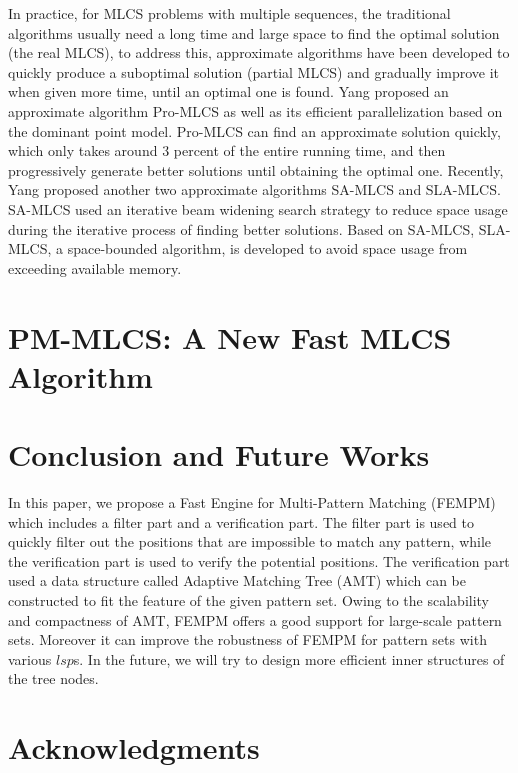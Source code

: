 \documentclass{article}
\begin{document}
In practice, for MLCS problems with multiple sequences, the
traditional algorithms usually need a long time and large space to
find the optimal solution (the real MLCS), to address this,
approximate algorithms have been developed to quickly produce a
suboptimal solution (partial MLCS) and gradually improve it when given
more time, until an optimal one is found. Yang \cite{Yang2013}
proposed an approximate algorithm Pro-MLCS as well as its efficient
parallelization based on the dominant point model. Pro-MLCS can find
an approximate solution quickly, which only takes around 3 percent of
the entire running time, and then progressively generate better
solutions until obtaining the optimal one. Recently, Yang
\cite{Yang2014} proposed another two approximate algorithms SA-MLCS
and SLA-MLCS. SA-MLCS used an iterative beam widening search strategy
to reduce space usage during the iterative process of finding better
solutions. Based on SA-MLCS, SLA-MLCS, a space-bounded algorithm, is
developed to avoid space usage from exceeding available memory.


\section{PM-MLCS: A New Fast MLCS Algorithm}
\label{sec:PM-MLCS}


\section{Conclusion and Future Works}
\label{sec:conclusion}

In this paper, we propose a Fast Engine for Multi-Pattern Matching
(\textsf{FEMPM}) which includes a filter part and a verification
part. The filter part is used to quickly filter out the positions that
are impossible to match any pattern, while the verification part is
used to verify the potential positions. The verification part used a
data structure called Adaptive Matching Tree (AMT) which can be
constructed to fit the feature of the given pattern set. Owing to the
scalability and compactness of AMT, \textsf{FEMPM} offers a good
support for large-scale pattern sets. Moreover it can improve the
robustness of \textsf{FEMPM} for pattern sets with various $lsp$s. In
the future, we will try to design more efficient inner structures of
the tree nodes.

\section{Acknowledgments}
\end{document}
